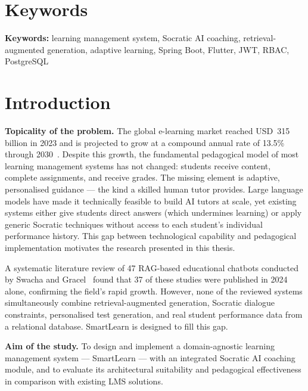 \documentclass[12pt,a4paper]{report}
\begin{document}
\chapter*{Keywords}

\textbf{Keywords:} learning management system, Socratic AI coaching,
retrieval-augmented generation, adaptive learning, Spring Boot, Flutter, JWT, RBAC,
PostgreSQL

\tableofcontents

\listoffigures
\listoftables

\chapter*{Introduction}

\noindent\textbf{Topicality of the problem.} The global e-learning market reached
USD~315 billion in 2023 and is projected to grow at a compound annual rate of 13.5\%
through 2030~\cite{ref1}. Despite this growth, the fundamental pedagogical model of
most learning management systems has not changed: students receive content, complete
assignments, and receive grades. The missing element is adaptive, personalised
guidance --- the kind a skilled human tutor provides. Large language models have made
it technically feasible to build AI tutors at scale, yet existing systems either give
students direct answers (which undermines learning) or apply generic Socratic
techniques without access to each student's individual performance history. This gap
between technological capability and pedagogical implementation motivates the
research presented in this thesis.

A systematic literature review of 47 RAG-based educational chatbots conducted by
Swacha and Gracel~\cite{ref12} found that 37 of these studies were published in 2024
alone, confirming the field's rapid growth. However, none of the reviewed systems
simultaneously combine retrieval-augmented generation, Socratic dialogue constraints,
personalised test generation, and real student performance data from a relational
database. SmartLearn is designed to fill this gap.

\noindent\textbf{Aim of the study.} To design and implement a domain-agnostic
learning management system --- SmartLearn --- with an integrated Socratic AI coaching
module, and to evaluate its architectural suitability and pedagogical effectiveness in
comparison with existing LMS solutions.
\end{document}
